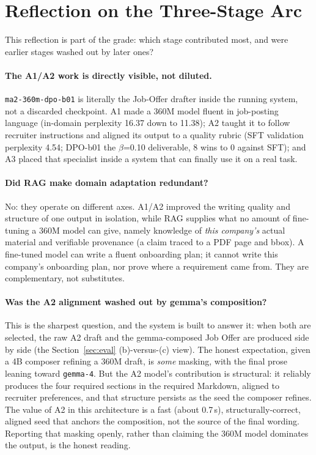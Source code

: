 \section{Reflection on the Three-Stage Arc}
\label{sec:arc}

This reflection is part of the grade: which stage contributed most, and were earlier stages
washed out by later ones?

\paragraph{The A1/A2 work is directly visible, not diluted.}
\verb|ma2-360m-dpo-b01| is literally the Job-Offer drafter inside the running system, not a
discarded checkpoint. A1 made a 360M model fluent in job-posting language (in-domain
perplexity 16.37 down to 11.38); A2 taught it to follow recruiter instructions and aligned
its output to a quality rubric (SFT validation perplexity 4.54; DPO-b01 the $\beta$=0.10
deliverable, 8 wins to 0 against SFT); and A3 placed that specialist inside a system that
can finally use it on a real task.

\paragraph{Did RAG make domain adaptation redundant?}
No: they operate on different axes. A1/A2 improved the writing quality and structure of one
output in isolation, while RAG supplies what no amount of fine-tuning a 360M model can give,
namely knowledge of \emph{this company's} actual material and verifiable provenance (a claim
traced to a PDF page and bbox). A fine-tuned model can write a fluent onboarding plan; it
cannot write this company's onboarding plan, nor prove where a requirement came from. They
are complementary, not substitutes.

\paragraph{Was the A2 alignment washed out by gemma's composition?}
This is the sharpest question, and the system is built to answer it: when both are selected,
the raw A2 draft and the gemma-composed Job Offer are produced side by side (the
Section~\ref{sec:eval} (b)-versus-(c) view). The honest expectation, given a 4B composer
refining a 360M draft, is \emph{some} masking, with the final prose leaning toward
\verb|gemma-4|. But the A2 model's contribution is structural: it reliably produces the four
required sections in the required Markdown, aligned to recruiter preferences, and that
structure persists as the seed the composer refines. The value of A2 in this architecture is
a fast (about 0.7\,s), structurally-correct, aligned seed that anchors the composition, not
the source of the final wording. Reporting that masking openly, rather than claiming the
360M model dominates the output, is the honest reading.

